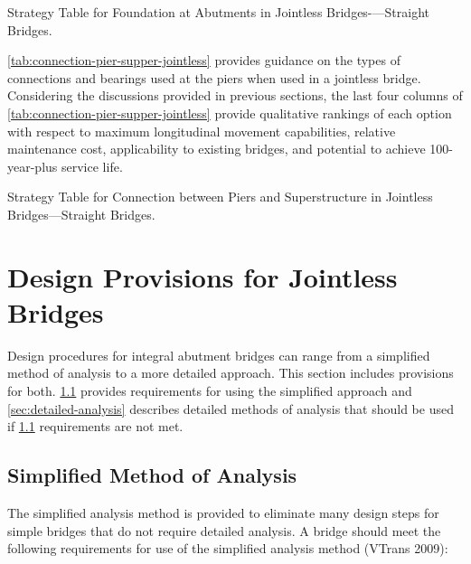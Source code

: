 \begin{table}
  \caption{Strategy Table for Foundation at Abutments in Jointless Bridges-—Straight Bridges.}\label{tab:foundation-select-jointless}
\end{table}

\cref{tab:connection-pier-supper-jointless} provides guidance on the types of connections and bearings used at the piers when used in a jointless
bridge. Considering the discussions provided in previous sections, the last four columns of \cref{tab:connection-pier-supper-jointless} provide
qualitative rankings of each option with respect to maximum longitudinal movement capabilities, relative
maintenance cost, applicability to existing bridges, and potential to achieve 100-year-plus service life.

\begin{table}
  \caption{Strategy Table for Connection between Piers and Superstructure in Jointless Bridges—Straight Bridges.}\label{tab:connection-pier-supper-jointless}
\end{table}

\section{Design Provisions for Jointless Bridges}
Design procedures for integral abutment bridges can range from a simplified method of analysis to a more
detailed approach. This section includes provisions for both. \cref{sec:smiplified-analysis} provides requirements for using the simplified approach and \cref{sec:detailed-analysis} describes detailed methods of analysis that should be used if \cref{sec:smiplified-analysis}
requirements are not met.

\subsection{Simplified Method of Analysis}\label{sec:smiplified-analysis}
The simplified analysis method is provided to eliminate many design steps for simple bridges that do not require
detailed analysis. A bridge should meet the following requirements for use of the simplified analysis method (VTrans
2009):

